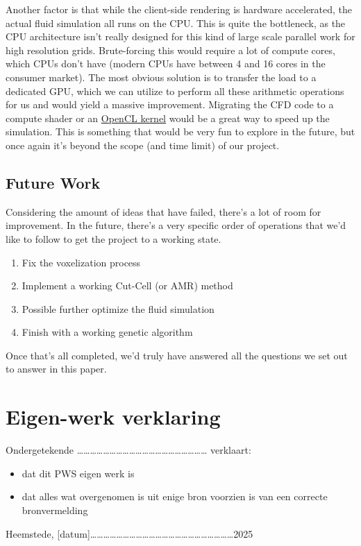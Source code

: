 \documentclass[a4paper,12pt,titlepage]{article}
\begin{document}
Another factor is that while the client-side rendering is hardware accelerated,
the actual fluid simulation all runs on the CPU. This is quite the bottleneck,
as the CPU architecture isn't really designed for this kind of large scale
parallel work for high resolution grids. Brute-forcing this would require a lot
of compute cores, which CPUs don't have (modern CPUs have between 4 and 16 cores
in the consumer market). The most obvious solution is to transfer the load to
a dedicated GPU, which we can utilize to perform all these arithmetic operations
for us and would yield a massive improvement. Migrating the CFD code to a compute
shader or an \href{https://en.wikipedia.org/wiki/OpenCL}{OpenCL kernel} would
be a great way to speed up the simulation. This is something that would be very
fun to explore in the future, but once again it's beyond the scope (and time limit)
of our project.

\subsection{Future Work}
Considering the amount of ideas that have failed, there's a lot of room for
improvement. In the future, there's a very specific order of operations that
we'd like to follow to get the project to a working state.
\begin{enumerate}
	\item{Fix the voxelization process}
	\item{Implement a working Cut-Cell (or AMR) method}
	\item{Possible further optimize the fluid simulation}
	\item{Finish with a working genetic algorithm}
\end{enumerate}
Once that's all completed, we'd truly have answered all the questions we set out
to answer in this paper.

\pagebreak
\section{Eigen-werk verklaring}
Ondergetekende …………………………………………………… verklaart:

\begin{itemize}
	\item{dat dit PWS eigen werk is}
	\item{dat alles wat overgenomen is uit enige bron voorzien is van een correcte bronvermelding}
\end{itemize}

Heemstede, [datum]…………………………………………………………2025 \\
\end{document}
